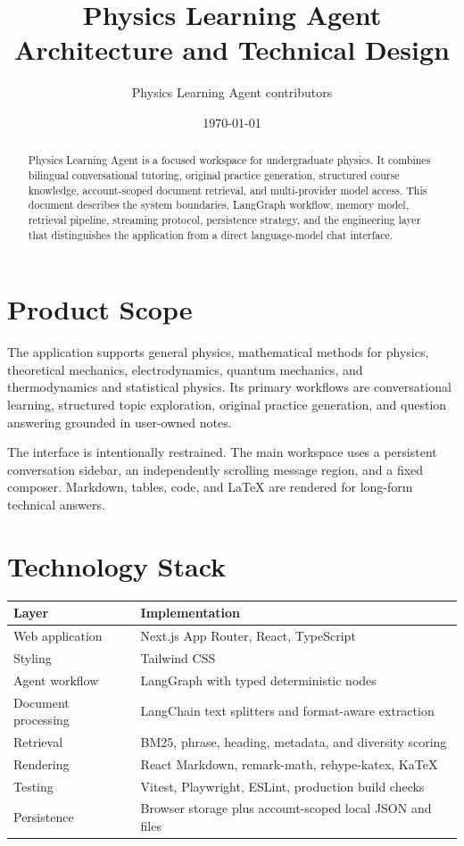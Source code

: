\documentclass[a4paper,11pt]{article}
\title{Physics Learning Agent\\Architecture and Technical Design}
\author{Physics Learning Agent contributors}
\date{\today}
\begin{document}
\maketitle

\begin{abstract}
Physics Learning Agent is a focused workspace for undergraduate physics. It combines bilingual conversational tutoring, original practice generation, structured course knowledge, account-scoped document retrieval, and multi-provider model access. This document describes the system boundaries, LangGraph workflow, memory model, retrieval pipeline, streaming protocol, persistence strategy, and the engineering layer that distinguishes the application from a direct language-model chat interface.
\end{abstract}

\tableofcontents

\section{Product Scope}

The application supports general physics, mathematical methods for physics, theoretical mechanics, electrodynamics, quantum mechanics, and thermodynamics and statistical physics. Its primary workflows are conversational learning, structured topic exploration, original practice generation, and question answering grounded in user-owned notes.

The interface is intentionally restrained. The main workspace uses a persistent conversation sidebar, an independently scrolling message region, and a fixed composer. Markdown, tables, code, and LaTeX are rendered for long-form technical answers.

\section{Technology Stack}

\begin{tabular}{p{}p{}}
\toprule
Layer & Implementation \\
\midrule
Web application & Next.js App Router, React, TypeScript \\
Styling & Tailwind CSS \\
Agent workflow & LangGraph with typed deterministic nodes \\
Document processing & LangChain text splitters and format-aware extraction \\
Retrieval & BM25, phrase, heading, metadata, and diversity scoring \\
Rendering & React Markdown, remark-math, rehype-katex, KaTeX \\
Testing & Vitest, Playwright, ESLint, production build checks \\
Persistence & Browser storage plus account-scoped local JSON and files \\
\bottomrule
\end{tabular}
\end{document}
